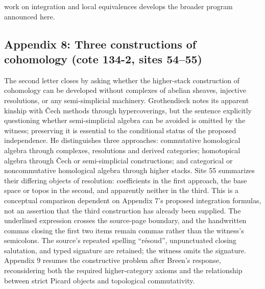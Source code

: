 work on integration and local equivalences develops the broader program announced here.

\subsection*{Appendix 8: Three constructions of cohomology (cote 134-2, sites 54--55)}
The second letter closes by asking whether the higher-stack construction of cohomology can be developed without complexes of abelian sheaves, injective resolutions, or any semi-simplicial machinery. Grothendieck notes its apparent kinship with \v Cech methods through hypercoverings, but the sentence explicitly questioning whether semi-simplicial algebra can be avoided is omitted by the witness; preserving it is essential to the conditional status of the proposed independence. He distinguishes three approaches: commutative homological algebra through complexes, resolutions and derived categories; homotopical algebra through \v Cech or semi-simplicial constructions; and categorical or noncommutative homological algebra through higher stacks. Site 55 summarizes their differing objects of resolution: coefficients in the first approach, the base space or topos in the second, and apparently neither in the third. This is a conceptual comparison dependent on Appendix 7's proposed integration formulas, not an assertion that the third construction has already been supplied. The underlined expression crosses the source-page boundary, and the handwritten commas closing the first two items remain commas rather than the witness's semicolons. The source's repeated spelling ``résoud'', unpunctuated closing salutation, and typed signature are retained; the witness omits the signature. Appendix 9 resumes the constructive problem after Breen's response, reconsidering both the required higher-category axioms and the relationship between strict Picard objects and topological commutativity.

